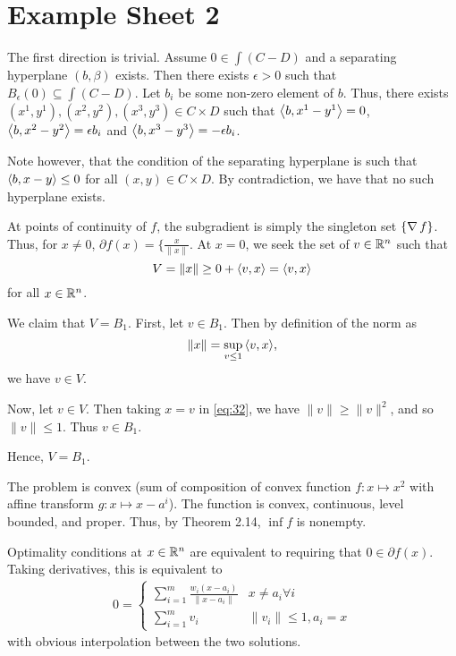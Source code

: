 \chapter{Example Sheet 2}
\label{cha:example-sheet-2}

\begin{exercises}
\item The first direction is trivial. Assume $0 \in \int (C - D)$ and
  a separating hyperplane $(b, \beta)$ exists. Then there exists $\epsilon
  > 0$ such that $B_{\epsilon}(0) \subseteq \int (C - D)$. Let $b_{i}$
  be some non-zero element of $b$. Thus, there exists $(x^{1}, y^{1}),
  (x^{2}, y^{2}), (x^{3}, y^{3}) \in C \times D$ such that $\IP{b,
    x^{1} - y^{1}} = 0$, $\IP{b, x^{2} - y^{2}} = \epsilon b_{i}$ and
  $\IP{b, x^{3} - y^{3}} = -\epsilon b_{i}$.

  Note however, that the condition of the separating hyperplane is
  such that $\IP{b, x - y} \leq 0$ for all $(x, y) \in C \times D$.
  By contradiction, we have that no such hyperplane exists.

\item
  At points of continuity of $f$, the subgradient is simply the singleton set
  $\{ \operatorname*{\nabla} f \}$.  Thus, for $x \neq 0$, $\partial f(x) = \{
  \frac{x}{\| x \|}$.  At $x = 0$, we seek the set of $v \in \mathbb{R}^{n}$
  such that
  \begin{equation}
    \label{eq:31}
    V = \| x \| \geq 0 + \IP{v, x} = \IP{v, x}
  \end{equation} for all $x \in \mathbb{R}^{n}$.

  We claim that $V = B_{1}$.  First, let $v \in B_{1}$. Then by
  definition of the norm as
  \begin{equation}
    \label{eq:32}
    \| x \| = \sup_{v \leq 1} \IP{v, x},
  \end{equation} we have $v \in V$.

  Now, let $v \in V$.  Then taking $x = v$ in \eqref{eq:32}, we have
  $\| v \| \geq \| v \|^{2}$, and so $\| v \| \leq 1$.  Thus $v \in
  B_{1}$.

  Hence, $V = B_{1}$.
\item The problem is convex (sum of composition of convex function $f:
  x \mapsto x^{2}$ with affine transform $g: x \mapsto x - a^{i}$).
  The function is convex, continuous, level bounded, and proper.
  Thus, by Theorem 2.14, $\inf f$ is nonempty.

  Optimality conditions at $x \in \mathbb{R}^{n}$ are equivalent to requiring
  that $0 \in \partial f(x)$.  Taking derivatives, this is equivalent
  to
  \begin{align}
    \label{eq:33}
    0 =
    \begin{cases}
      \sum_{i=1}^{m} \frac{w_{i}(x - a_{i})}{\|x - a_{i} \|} & x \neq
      a_{i} \forall i \\
      \sum_{i=1}^{m} v_{i} & \| v_{i} \| \leq 1, a_{i} = x
    \end{cases}
  \end{align}
  with obvious interpolation between the two solutions.


\end{exercises}
